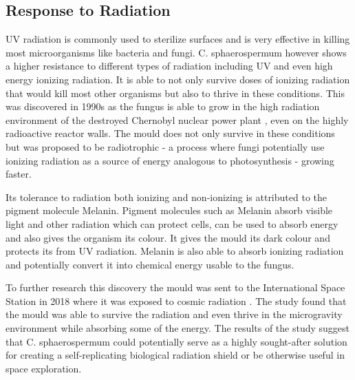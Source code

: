 \subsection{Response to Radiation}
UV radiation is commonly used to sterilize surfaces and is very effective in killing most microorganisms like bacteria and fungi. C. sphaerospermum however shows a higher resistance to different types of radiation including UV and even high energy ionizing radiation.  
It is able to not only survive doses of ionizing radiation that would kill most other organisms but also to thrive in these conditions. This was discovered in 1990s as the fungus is able to grow in the high radiation environment of the destroyed Chernobyl nuclear power plant \cite{radiation}, even on the highly radioactive reactor walls. The mould does not only survive in these conditions but was proposed to be radiotrophic - a process where fungi potentially use ionizing radiation as a source of energy analogous to photosynthesis - growing faster.

Its tolerance to radiation both ionizing and non-ionizing is attributed to the pigment molecule Melanin. Pigment molecules such as Melanin absorb visible light and other radiation which can protect cells, can be used to absorb energy and also gives the organism its colour. It gives the mould its dark colour and protects its from UV radiation. Melanin is also able to absorb ionizing radiation and potentially convert it into chemical energy usable to the fungus.

To further research this discovery the mould was sent to the International Space Station in 2018 where it was exposed to cosmic radiation \cite{iss}. The study found that the mould was able to survive the radiation and even thrive in the microgravity environment while absorbing some of the energy. The results of the study suggest that C. sphaerospermum could potentially serve as a highly sought-after solution for creating a self-replicating biological radiation shield or be otherwise useful in space exploration.

